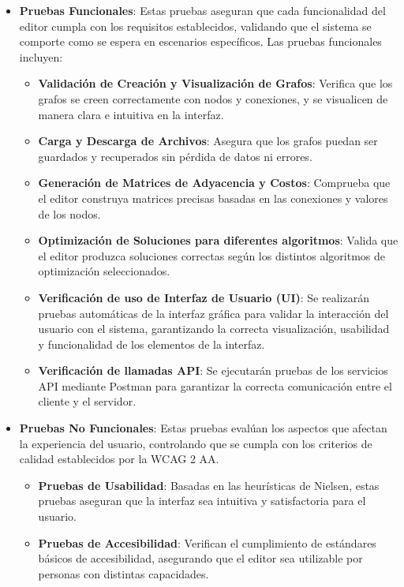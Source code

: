 \documentclass[stu, 12pt, letterpaper, donotrepeattitle, floatsintext, natbib]{apa7}
\begin{document}
\begin{itemize}
    \item \textbf{Pruebas Funcionales}: Estas pruebas aseguran que cada funcionalidad del editor cumpla con los requisitos establecidos, validando que el sistema se comporte como se espera en escenarios específicos. Las pruebas funcionales incluyen:
    \begin{itemize}
        \item \textbf{Validación de Creación y Visualización de Grafos}: Verifica que los grafos se creen correctamente con nodos y conexiones, y se visualicen de manera clara e intuitiva en la interfaz.
        \item \textbf{Carga y Descarga de Archivos}: Asegura que los grafos puedan ser guardados y recuperados sin pérdida de datos ni errores.
        \item \textbf{Generación de Matrices de Adyacencia y Costos}: Comprueba que el editor construya matrices precisas basadas en las conexiones y valores de los nodos.
        \item \textbf{Optimización de Soluciones para diferentes algoritmos}: Valida que el editor produzca soluciones correctas según los distintos algoritmos de optimización seleccionados.
        \item \textbf{Verificación de uso de Interfaz de Usuario (UI)}: Se realizarán pruebas automáticas de la interfaz gráfica para validar la interacción del usuario con el sistema, garantizando la correcta visualización, usabilidad y funcionalidad de los elementos de la interfaz.
        \item \textbf{Verificación de llamadas API}: Se ejecutarán pruebas de los servicios API mediante Postman para garantizar la correcta comunicación entre el cliente y el servidor.
    \end{itemize}

    \item \textbf{Pruebas No Funcionales}: Estas pruebas evalúan los aspectos que afectan la experiencia del usuario, controlando que se cumpla con los criterios de calidad establecidos por la WCAG 2 AA.    
    \begin{itemize}
        \item \textbf{Pruebas de Usabilidad}: Basadas en las heurísticas de Nielsen, estas pruebas aseguran que la interfaz sea intuitiva y satisfactoria para el usuario.
        \item \textbf{Pruebas de Accesibilidad}: Verifican el cumplimiento de estándares básicos de accesibilidad, asegurando que el editor sea utilizable por personas con distintas capacidades.
    \end{itemize}
\end{itemize}
\end{document}
